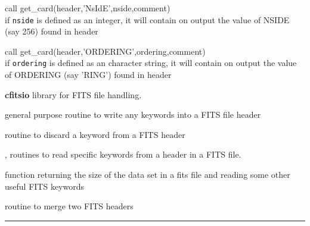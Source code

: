 \begin{example}
{
call get\_card(header,'NsIdE',nside,comment)  \\
}
{
if {\tt nside} is defined as an integer, it
will contain on output the value of NSIDE (say 256) found in header
}
\end{example}

\begin{example}
{
call get\_card(header,'ORDERING',ordering,comment)  \\
}
{
if {\tt ordering} is defined as an character string, it
will contain on output the value of ORDERING (say 'RING') found in header
}
\end{example}

\begin{modules}
  \begin{sulist}{} %
  \item[\textbf{cfitsio}] library for FITS file handling.		
  \end{sulist}
\end{modules}

\begin{related}
  \begin{sulist}{} %
  \item[\htmlref{add\_card}{sub:add_card}] general purpose routine to write any keywords into a FITS
  file header
  \item[\htmlref{del\_card}{sub:del_card}] routine to discard a keyword from a FITS header
  \item[\htmlref{read\_par}{sub:read_par}, \htmlref{number\_of\_alms}{sub:number_of_alms}] routines to read specific keywords from a
  header in a FITS file.
  \item[\htmlref{getsize\_fits}{sub:getsize_fits}] function returning the size of the data set in a fits
  file and reading some other useful FITS keywords
  \item[\htmlref{merge\_headers}{sub:merge_headers}] routine to merge two FITS headers
  \end{sulist}
\end{related}

\rule{\hsize}{2mm}

\newpage
